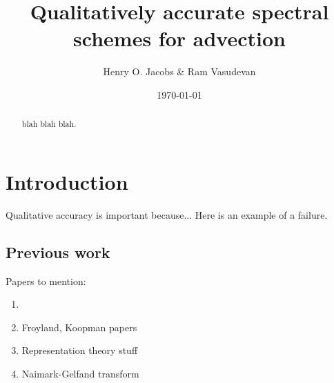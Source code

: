 \documentclass[12pt]{amsart}
\title{Qualitatively accurate spectral schemes for advection}
\author{Henry O. Jacobs \& Ram Vasudevan}
\date{\today}
\begin{document}
\maketitle

\begin{abstract}
  blah blah blah.
\end{abstract}

\section{Introduction}
\label{sec:intro}

Qualitative accuracy is important because...
Here is an example of a failure.

\subsection{Previous work}
Papers to mention:
\begin{enumerate}
	\item \cite{HenrionKorda2014}
	\item Froyland, Koopman papers
	\item Representation theory stuff \cite{VershilGelfandGraev1975,Ismagilov1975}
	\item Naimark-Gelfand transform 
\end{enumerate}

\end{document}
